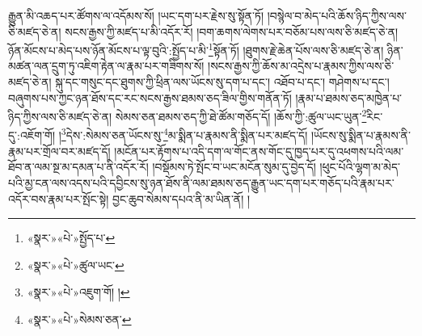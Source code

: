 རྒྱུན་མི་འཆད་པར་ཚོགས་ལ་འདོམས་སོ། །ཡང་དག་པར་རྗེས་སུ་སྟོན་ཏོ། །བསྙེལ་བ་མེད་པའི་ཆོས་ཉིད་ཀྱིས་ལས་ཅི་མཛད་ཅེ་ན། སངས་རྒྱས་ཀྱི་མཛད་པ་མི་འདོར་རོ། །བག་ཆགས་ལེགས་པར་བཅོམ་པས་ལས་ཅི་མཛད་ཅེ་ན། ཉོན་མོངས་པ་མེད་པས་ཉོན་མོངས་པ་ལྟ་བུའི་:སྤྱོད་པ་མི་\footnote{«སྣར་»«པེ་»སྤྱོད་པ་}སྟོན་ཏོ། །ཐུགས་རྗེ་ཆེན་པོས་ལས་ཅི་མཛད་ཅེ་ན། ཉིན་མཚན་ལན་དྲུག་ཏུ་འཇིག་རྟེན་ལ་རྣམ་པར་གཟིགས་སོ། །སངས་རྒྱས་ཀྱི་ཆོས་མ་འདྲེས་པ་རྣམས་ཀྱིས་ལས་ཅི་མཛད་ཅེ་ན། སྐུ་དང་གསུང་དང་ཐུགས་ཀྱི་ཕྲིན་ལས་ཡོངས་སུ་དག་པ་དང་། འཐོབ་པ་དང་། གཤེགས་པ་དང་། བཞུགས་པས་ཀྱང་ཉན་ཐོས་དང་རང་སངས་རྒྱས་ཐམས་ཅད་ཟིལ་གྱིས་གནོན་ཏོ། །རྣམ་པ་ཐམས་ཅད་མཁྱེན་པ་ཉིད་ཀྱིས་ལས་ཅི་མཛད་ཅེ་ན། སེམས་ཅན་ཐམས་ཅད་ཀྱི་ཐེ་ཚོམ་གཅོད་དོ། །ཆོས་ཀྱི་:ཚུལ་ཡང་ཡུན་\footnote{«སྣར་»«པེ་»ཚུལ་ཡང་}རིང་དུ་:འཇོག་གོ། །\footnote{«སྣར་»«པེ་»འཇུག་གོ། །}དེས་:སེམས་ཅན་ཡོངས་སུ་\footnote{«སྣར་»«པེ་»སེམས་ཅན་}མ་སྨིན་པ་རྣམས་ནི་སྨིན་པར་མཛད་དོ། །ཡོངས་སུ་སྨིན་པ་རྣམས་ནི་རྣམ་པར་གྲོལ་བར་མཛད་དོ། །མངོན་པར་རྟོགས་པ་འདི་དག་ལ་གོང་ནས་གོང་དུ་ཁྱད་པར་དུ་འཕགས་པའི་ལམ་ཐོབ་ན་ལམ་སྔ་མ་དམན་པ་ནི་འདོར་རོ། །བསྡོམས་ཏེ་སྤོང་བ་ཡང་མངོན་སུམ་དུ་བྱེད་དོ། །ཕུང་པོའི་ལྷག་མ་མེད་པའི་མྱ་ངན་ལས་འདས་པའི་དབྱིངས་སུ་ཉན་ཐོས་ནི་ལམ་ཐམས་ཅད་རྒྱུན་ཡང་དག་པར་གཅོད་པའི་རྣམ་པར་འདོར་བས་རྣམ་པར་སྤོང་སྟེ། བྱང་ཆུབ་སེམས་དཔའ་ནི་མ་ཡིན་ནོ། །

